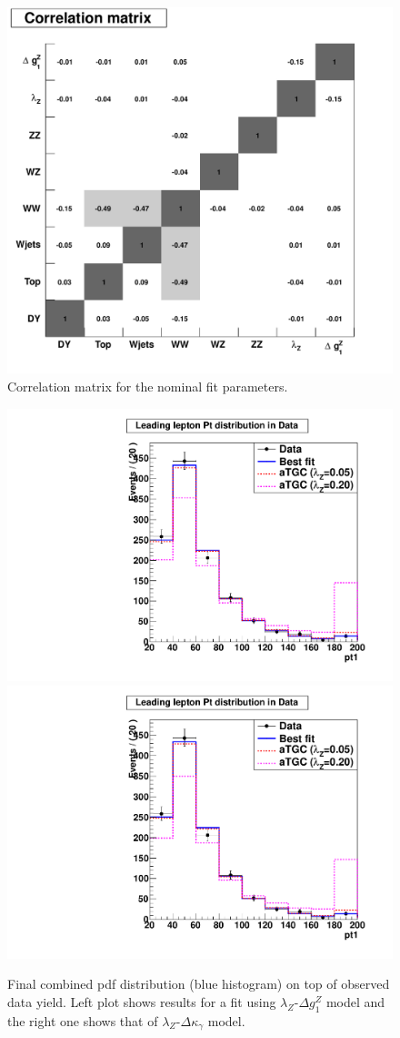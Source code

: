 \begin{figure}[tp]
  \centering
    \includegraphics[width=.60\textwidth]{figures/correlations}

  \caption[Fit parameter correlations] {Correlation matrix for the nominal fit parameters.}
  \label{fig:fit_correlations}
\end{figure}

\begin{figure}[tp]
  \centering
    \includegraphics[width=.45\textwidth]{figures/lz_dgz_pdf_data}
    \includegraphics[width=.45\textwidth]{figures/lz_dkg_pdf_data}

  \caption[Fit on data] {Final combined pdf distribution (blue
  histogram) on top of observed data yield. Left plot shows results
  for a fit using $\lambda_Z$-$\Delta g^Z_1$ model and the right one
  shows that of $\lambda_Z$-$\Delta\kappa_{\gamma}$ model.} \label{fig:fit_data}
\end{figure}
